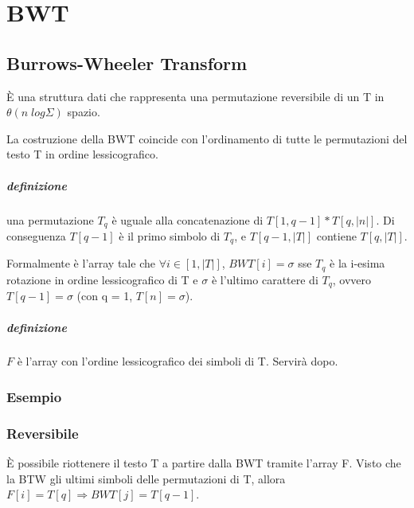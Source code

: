\chapter{BWT}

\section{Burrows-Wheeler Transform}

\`E una struttura dati che rappresenta una permutazione reversibile di un T in $\theta(n\;log\Sigma)$ spazio.

La costruzione della BWT coincide con l'ordinamento di tutte le permutazioni del testo T in ordine lessicografico.

\paragraph{definizione} una permutazione $T_q$ \`e uguale alla concatenazione di $T[1,q-1] \ast T[q,|n|]$.
Di conseguenza $T[q-1]$ \`e il primo simbolo di $T_q$, e $T[q-1 ,|T|]$ contiene $T[q, |T|]$.

Formalmente \`e l'array tale che $\forall i \in [1,|T|]$, $BWT[i] = \sigma$ sse $T_q$ \`e la i-esima rotazione in ordine lessicografico di T e $\sigma$ \`e l'ultimo carattere di $T_q$, ovvero $T[q-1] = \sigma$ (con q = 1, $T[n] = \sigma$).

\paragraph{definizione} $F$ \`e l'array con l'ordine lessicografico dei simboli di T. Servir\`a dopo.

\subsection{Esempio}


\subsection{Reversibile}

\`E possibile riottenere il testo T a partire dalla BWT tramite l'array F. Visto che la BTW gli ultimi simboli delle permutazioni di T, allora $F[i] = T[q] \Rightarrow BWT[j] = T[q-1]$.

